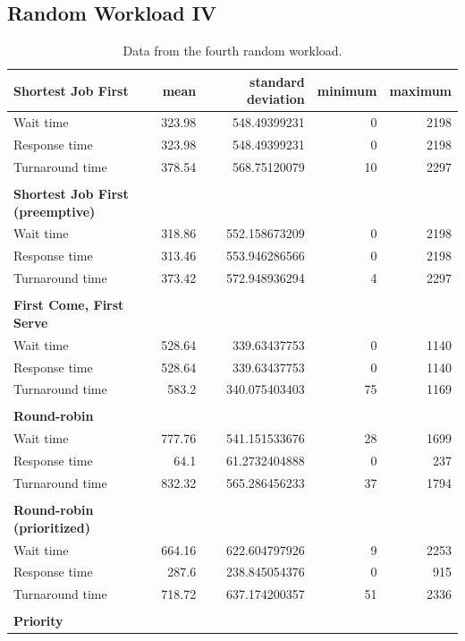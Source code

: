 \documentclass[12pt,letterpaper]{article}
\begin{document}
\begin{appendices}
			\subsection{Random Workload IV}
			\begin{table}[H]
	  			\caption{Data from the fourth random workload.}
		  		\begin{tabular}{l r r r r}
					\textbf{Shortest Job First} & mean & standard deviation & minimum & maximum\\
					\hline
Wait time &			323.98 &	548.49399231 &	0 &	2198 	\\
Response time &		323.98 &	548.49399231 &	0 &	2198 	\\
Turnaround time &	378.54 &	568.75120079 &	10 &	2297 	\\
					\\
					\textbf{Shortest Job First (preemptive)} \\
					\hline
Wait time &			318.86 &	552.158673209 &	0 &	2198 	\\
Response time &		313.46 &	553.946286566 &	0 &	2198 	\\
Turnaround time &	373.42 &	572.948936294 &	4 &	2297 	\\
					\\
					\textbf{First Come, First Serve} \\
					\hline
Wait time &			528.64 &	339.63437753 &	0 &	1140 	\\
Response time &		528.64 &	339.63437753 &	0 &	1140 	\\
Turnaround time &	583.2 &	340.075403403 &	75 &	1169 	\\
					\\
					\textbf{Round-robin} \\
					\hline
					Wait time &		777.76 &	541.151533676 &	28 &	1699 	\\
Response time &		64.1 &	61.2732404888 &	0 &	237 	\\
Turnaround time &	832.32 &	565.286456233 &	37 &	1794 	\\
					\\
					\textbf{Round-robin (prioritized)} \\
					\hline
					Wait time &		664.16 &	622.604797926 &	9 &	2253	\\
Response time &		287.6 &	238.845054376 &	0 &	915 	\\
Turnaround time &	718.72 &	637.174200357 &	51 &	2336 	\\
					\\
					\textbf{Priority} \\

\end{tabular}
\end{table}
\end{appendices}
\end{document}
